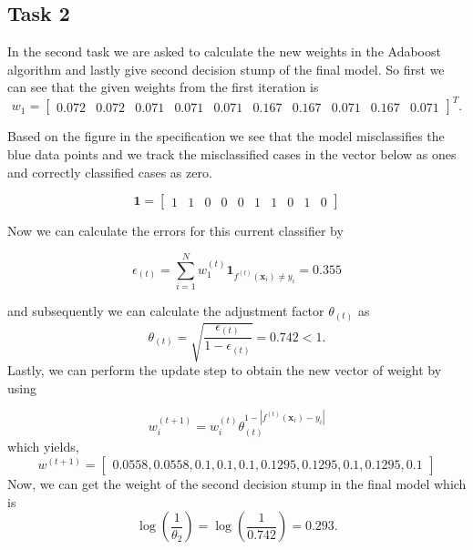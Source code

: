 \documentclass[
]{article}
\begin{document}
\hypertarget{task-2}{%
\subsection{Task 2}\label{task-2}}

In the second task we are asked to calculate the new weights in the
Adaboost algorithm and lastly give second decision stump of the final
model. So first we can see that the given weights from the first
iteration is \[
w_1 = \begin{bmatrix} 0.072 & 0.072 & 0.071 & 0.071 & 0.071 & 0.167 & 0.167 & 0.071 & 0.167 & 0.071 \end{bmatrix} ^T.
\]

Based on the figure in the specification we see that the model
misclassifies the blue data points and we track the misclassified cases
in the vector below as ones and correctly classified cases as zero.

\[
\mathbf{1} = \begin{bmatrix} 1 & 1 & 0 & 0 & 0 & 1 & 1 & 0 & 1 & 0 \end{bmatrix}
\]

Now we can calculate the errors for this current classifier by

\[
  \epsilon_{(t)} = \sum^N_{i=1} w_1^{(t)} \mathbf{1}_{f^{(t)} (\mathbf{x}_i) \neq y_i}
  = 0.355
\]

and subsequently we can calculate the adjustment factor \(\theta_{(t)}\)
as \[
  \theta_{(t)} = \sqrt{\frac{\epsilon_{(t)}}{1 - \epsilon_{(t)}}} = 0.742 < 1.
\] Lastly, we can perform the update step to obtain the new vector of
weight by using

\[
  w_i^{(t+1)} = w_i^{(t)} \theta_{(t)}^{1 - |f^{(t)}(\mathbf{x}_i) - y_i|}
\] which yields, \[
  w^{(t+1)} = \begin{bmatrix} 0.0558, 0.0558, 0.1, 0.1, 0.1, 0.1295, 0.1295, 0.1, 0.1295, 0.1 \end{bmatrix}
\] Now, we can get the weight of the second decision stump in the final
model which is \[
  \log{(\frac{1}{\theta_2})} = \log{(\frac{1}{0.742})} = 0.293.
\]
\end{document}
